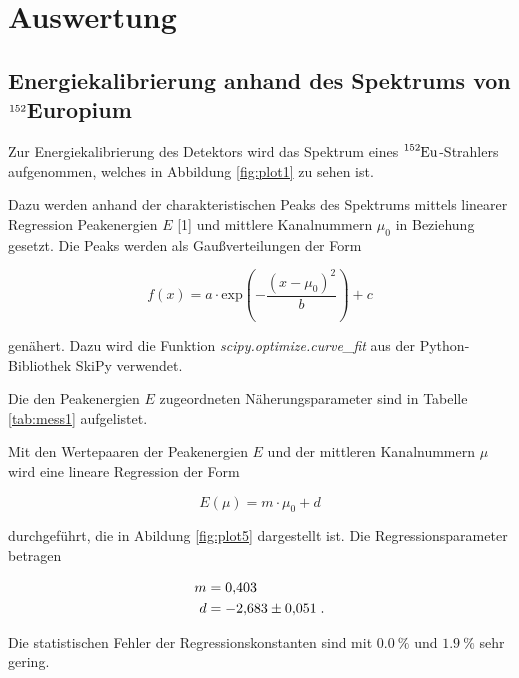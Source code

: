 \section{Auswertung}
\label{sec:Auswertung}


\subsection{Energiekalibrierung anhand des Spektrums von $\ce{^{152}}$Europium}

Zur Energiekalibrierung des Detektors wird das Spektrum eines $\ce{^{152}Eu}$-Strahlers aufgenommen, welches in Abbildung
\ref{fig:plot1} zu sehen ist.



Dazu werden anhand der charakteristischen Peaks des Spektrums mittels linearer Regression Peakenergien $E$ [1] und mittlere 
Kanalnummern $\mu_0$ in Beziehung gesetzt.
Die Peaks werden als Gaußverteilungen der Form 

\begin{equation}
  f(x) = a \cdot \text{exp}\left( - \frac{(x-\mu_0)^2}{b}\right) + c
  \label{eqn:gauss}
\end{equation}

genähert. Dazu wird die Funktion \textit{scipy.optimize.curve\_fit} aus der Python-Bibliothek SkiPy verwendet.

Die den Peakenergien $E$ zugeordneten Näherungsparameter sind in Tabelle \ref{tab:mess1} aufgelistet.

Mit den Wertepaaren der Peakenergien $E$ und der mittleren Kanalnummern $\mu$ wird eine lineare Regression der Form

\begin{equation}
  E(\mu) = m \cdot \mu_0 + d
  \label{eqn:eich}
\end{equation}
  
durchgeführt, die in Abildung \ref{fig:plot5} dargestellt ist.
Die Regressionsparameter betragen

\begin{align*}
  m &= \num{0.403 +- 0.000} \\
  d &= \num{-2.683 +- 0.051} \; .
\end{align*}

Die statistischen Fehler der Regressionskonstanten sind mit $\SI{0.0}{\percent}$ und $\SI{1.9}{\percent}$ sehr gering.

